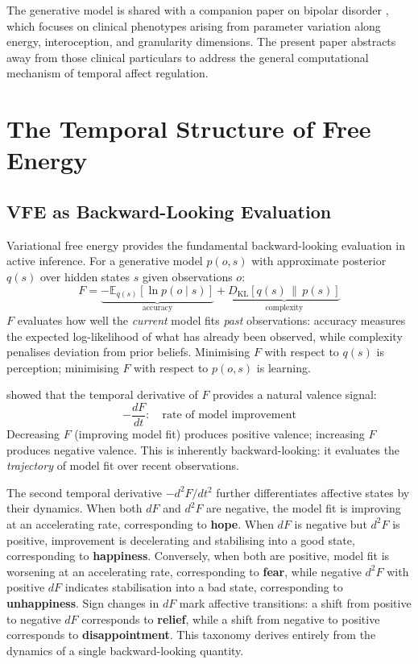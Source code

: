 \documentclass[11pt,a4paper]{article}
\begin{document}
The generative model is shared with a companion paper on bipolar disorder \citep{albarracin2026bipolar}, which focuses on clinical phenotypes arising from parameter variation along energy, interoception, and granularity dimensions. The present paper abstracts away from those clinical particulars to address the general computational mechanism of temporal affect regulation.


\section{The Temporal Structure of Free Energy}\label{sec:temporal_structure}

\subsection{VFE as Backward-Looking Evaluation}\label{sec:vfe}

Variational free energy provides the fundamental backward-looking evaluation in active inference. For a generative model $p(o, s)$ with approximate posterior $q(s)$ over hidden states $s$ given observations $o$:
\begin{equation}
    F = \underbrace{-\mathbb{E}_{q(s)}[\ln p(o \mid s)]}_{\text{accuracy}} + \underbrace{D_{\mathrm{KL}}[q(s) \,\|\, p(s)]}_{\text{complexity}}
\end{equation}
$F$ evaluates how well the \emph{current} model fits \emph{past} observations: accuracy measures the expected log-likelihood of what has already been observed, while complexity penalises deviation from prior beliefs. Minimising $F$ with respect to $q(s)$ is perception; minimising $F$ with respect to $p(o,s)$ is learning.

\citet{joffily2013emotional} showed that the temporal derivative of $F$ provides a natural valence signal:
\begin{equation}
    -\frac{dF}{dt}: \quad \text{rate of model improvement}
\end{equation}
Decreasing $F$ (improving model fit) produces positive valence; increasing $F$ produces negative valence. This is inherently backward-looking: it evaluates the \emph{trajectory} of model fit over recent observations.

The second temporal derivative $-d^2F/dt^2$ further differentiates affective states by their dynamics. When both $dF$ and $d^2F$ are negative, the model fit is improving at an accelerating rate, corresponding to \textbf{hope}. When $dF$ is negative but $d^2F$ is positive, improvement is decelerating and stabilising into a good state, corresponding to \textbf{happiness}. Conversely, when both are positive, model fit is worsening at an accelerating rate, corresponding to \textbf{fear}, while negative $d^2F$ with positive $dF$ indicates stabilisation into a bad state, corresponding to \textbf{unhappiness}. Sign changes in $dF$ mark affective transitions: a shift from positive to negative $dF$ corresponds to \textbf{relief}, while a shift from negative to positive corresponds to \textbf{disappointment}. This taxonomy derives entirely from the dynamics of a single backward-looking quantity.
\end{document}
